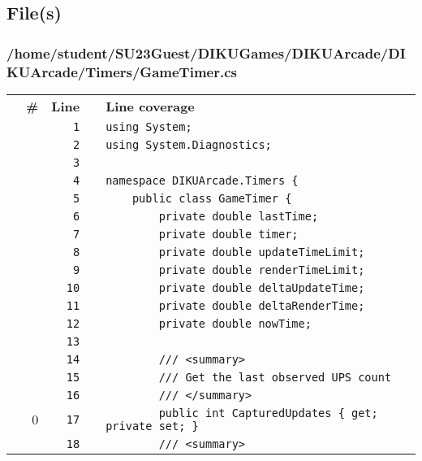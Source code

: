 \documentclass[a4paper,landscape,10pt]{article}
\begin{document}
\subsection{File(s)}
\subsubsection{/home/student/SU23Guest/DIKUGames/DIKUArcade/DIKUArcade/Timers/GameTimer.cs}
\begin{longtable}[l]{lrrll}
\textbf{} & \textbf{\#} & \textbf{Line} & \textbf{} & \textbf{Line coverage}\\
\cellcolor{gray} &  & \verb~1~ & & \verb~using System;~\\
\cellcolor{gray} &  & \verb~2~ & & \verb~using System.Diagnostics;~\\
\cellcolor{gray} &  & \verb~3~ & & \verb~~\\
\cellcolor{gray} &  & \verb~4~ & & \verb~namespace DIKUArcade.Timers {~\\
\cellcolor{gray} &  & \verb~5~ & & \verb~    public class GameTimer {~\\
\cellcolor{gray} &  & \verb~6~ & & \verb~        private double lastTime;~\\
\cellcolor{gray} &  & \verb~7~ & & \verb~        private double timer;~\\
\cellcolor{gray} &  & \verb~8~ & & \verb~        private double updateTimeLimit;~\\
\cellcolor{gray} &  & \verb~9~ & & \verb~        private double renderTimeLimit;~\\
\cellcolor{gray} &  & \verb~10~ & & \verb~        private double deltaUpdateTime;~\\
\cellcolor{gray} &  & \verb~11~ & & \verb~        private double deltaRenderTime;~\\
\cellcolor{gray} &  & \verb~12~ & & \verb~        private double nowTime;~\\
\cellcolor{gray} &  & \verb~13~ & & \verb~~\\
\cellcolor{gray} &  & \verb~14~ & & \verb~        /// <summary>~\\
\cellcolor{gray} &  & \verb~15~ & & \verb~        /// Get the last observed UPS count~\\
\cellcolor{gray} &  & \verb~16~ & & \verb~        /// </summary>~\\
\cellcolor{red} & 0 & \verb~17~ & & \verb~        public int CapturedUpdates { get; private set; }~\\
\cellcolor{gray} &  & \verb~18~ & & \verb~        /// <summary>~\\

\end{longtable}
\end{document}
